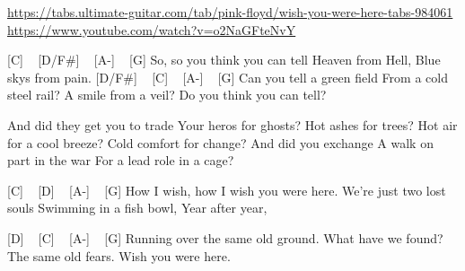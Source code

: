 
\url{https://tabs.ultimate-guitar.com/tab/pink-floyd/wish-you-were-here-tabs-984061}
\url{https://www.youtube.com/watch?v=o2NaGFteNvY}

[C] ~ [D/F#] ~ [A-] ~ [G] 
So, so you think you can tell
Heaven from Hell,
Blue skys from pain.
[D/F#] ~ [C] ~ [A-] ~ [G] 
Can you tell a green field
From a cold steel rail?
A smile from a veil?
Do you think you can tell?

And did they get you to trade
Your heros for ghosts?
Hot ashes for trees?
Hot air for a cool breeze?
Cold comfort for change?
And did you exchange
A walk on part in the war
For a lead role in a cage?

[C] ~ [D] ~ [A-] ~ [G]
How I wish, how I wish you were here.
We're just two lost souls
Swimming in a fish bowl,
Year after year,

[D] ~ [C] ~ [A-] ~ [G]
Running over the same old ground.
What have we found?
The same old fears.
Wish you were here. 
